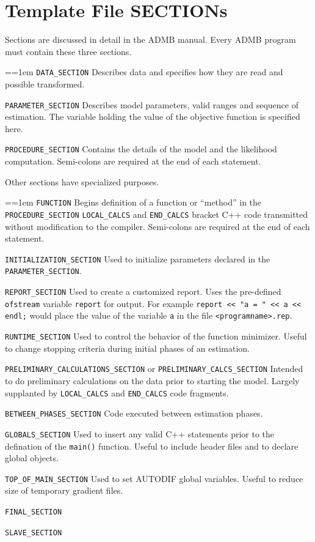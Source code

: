 \documentclass[a4paper,10pt,notumble]{leaflet}
\begin{document}
\section{Template File SECTIONs}
Sections are discussed in detail in the ADMB manual.
Every ADMB program must contain these three sections.

\par{\everypar={\hangindent=1em }
\verb+DATA_SECTION+ Describes data and specifies how they are read 
and possible transformed.

\verb+PARAMETER_SECTION+ Describes model parameters, valid ranges and
sequence of estimation. The variable holding the value of the
objective function is specified here.

\verb+PROCEDURE_SECTION+ Contains the details of the model and the
likelihood computation.
Semi-colons are required at the end of each statement.
}

Other sections have specialized purposes.

\par{\everypar={\hangindent=1em }
\verb+FUNCTION+ Begins definition of a function or ``method'' in the \verb+PROCEDURE_SECTION+ 
\verb+LOCAL_CALCS+ and \verb+END_CALCS+ bracket C++ code transmitted
without modification to the compiler. 
Semi-colons are required at the end of each statement.

\verb+INITIALIZATION_SECTION+
Used to initialize parameters declared in the \verb+PARAMETER_SECTION+. 

\verb+REPORT_SECTION+
Used to create a customized report. Uses the pre-defined
\verb+ofstream+ variable \verb+report+ for output. For example
\verb+report << "a = " << a << endl;+ would place the value of the
variable \verb+a+ in the file \verb+<programname>.rep+.

\verb+RUNTIME_SECTION+
Used to control the behavior of the function minimizer. Useful to
change stopping criteria during initial phases of an estimation.

\verb+PRELIMINARY_CALCULATIONS_SECTION+ or \verb+PRELIMINARY_CALCS_SECTION+
Intended to do preliminary calculations on the data prior to starting
the model. Largely supplanted by 
\verb+LOCAL_CALCS+ and \verb+END_CALCS+ code fragments.

\verb+BETWEEN_PHASES_SECTION+
Code executed between estimation phases.

\verb+GLOBALS_SECTION+
Used to insert any valid C++ statements prior to the defination of
the \verb+main()+ function. Useful to include header files and to
declare global objects.

\verb+TOP_OF_MAIN_SECTION+
Used to set AUTODIF global variables. Useful to reduce size of
temporary gradient files.

\verb+FINAL_SECTION+

\verb+SLAVE_SECTION+

}
\end{document}
